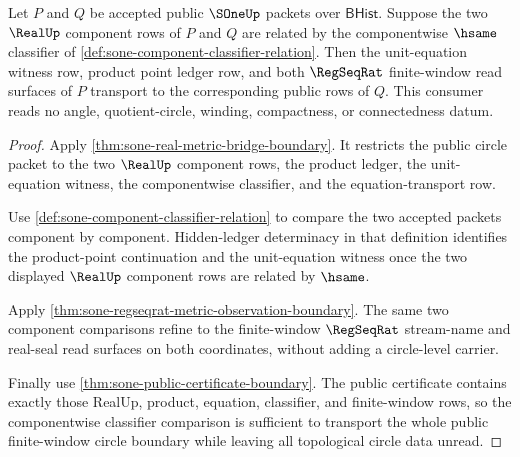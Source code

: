 \begin{theorem}
\label{thm:sone-componentwise-classifier-equation-transport}
Let $P$ and $Q$ be accepted public $\SOneUp$ packets over $\mathsf{BHist}$.
Suppose the two $\RealUp$ component rows of $P$ and $Q$ are related by the
componentwise $\hsame$ classifier of
\autoref{def:sone-component-classifier-relation}. Then the unit-equation
witness row, product point ledger row, and both $\RegSeqRat$ finite-window read
surfaces of $P$ transport to the corresponding public rows of $Q$. This
consumer reads no angle, quotient-circle, winding, compactness, or connectedness
datum.
\end{theorem}
\begin{proof}
Apply \autoref{thm:sone-real-metric-bridge-boundary}. It restricts the public
circle packet to the two $\RealUp$ component rows, the product ledger, the
unit-equation witness, the componentwise classifier, and the equation-transport
row.

Use \autoref{def:sone-component-classifier-relation} to compare the two
accepted packets component by component. Hidden-ledger determinacy in that
definition identifies the product-point continuation and the unit-equation
witness once the two displayed $\RealUp$ component rows are related by
$\hsame$.

Apply \autoref{thm:sone-regseqrat-metric-observation-boundary}. The same two
component comparisons refine to the finite-window $\RegSeqRat$ stream-name and
real-seal read surfaces on both coordinates, without adding a circle-level
carrier.

Finally use \autoref{thm:sone-public-certificate-boundary}. The public
certificate contains exactly those RealUp, product, equation, classifier, and
finite-window rows, so the componentwise classifier comparison is sufficient to
transport the whole public finite-window circle boundary while leaving all
topological circle data unread.
\end{proof}

